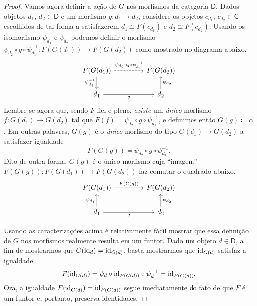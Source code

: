 \begin{proof}
  Vamos agora definir a ação de $G$ nos morfismos da categoria $\mathsf{D}$.
  Dados objetos $d_{1},\, d_{2} \in \mathsf{D}$ e um morfismo $g: d_{1} \to d_{2}$, considere os objetos $c_{d_{1}},\, c_{d_{2}} \in \mathsf{C}$ escolhidos de tal forma a satisfazerem $d_{1} \cong F(c_{d_{1}})$ e $d_{2} \cong F(c_{d_{2}})$.
  Usando os isomorfismo $\psi_{d_{1}}$ e $\psi_{d_{2}}$ podemos definir o morfismo $\psi_{d_{2}} \circ g \circ \psi_{d_{1}}^{-1}: F(G(d_{1})) \to F(G(d_{2}))$ como mostrado no diagrama abaixo.
  \begin{displaymath}
    \begin{tikzcd}[column sep=1.5cm]
      F(G(d_{1}))
      \arrow[r, dashed, "\psi_{d_{2}} \circ g \circ \psi_{d_{1}}^{-1}"]
      \arrow[d, "\psi_{d_{1}}^{-1}" swap]
      & F(G(d_{2}))
      \\ d_{1}
      \arrow[r, "g" swap]
      & d_{2}
      \arrow[u, "\psi_{d_{2}}" swap]
    \end{tikzcd}
  \end{displaymath}
  Lembre-se agora que, sendo $F$ fiel e pleno, \emph{existe} um \emph{único} morfismo $f: G(d_{1}) \to G(d_{2})$ tal que $F(f) = \psi_{d_{2}} \circ g \circ \psi_{d_{1}}^{-1}$, e definimos então $G(g) \coloneqq \alpha$.
  Em outras palavras, $G(g)$ é o \emph{único} morfismo do tipo $G(d_{1}) \to G(d_{2})$  a satisfazer igualdade
  \begin{displaymath}
    F(G(g)) = \psi_{d_{2}} \circ g \circ \psi_{d_{1}}^{-1}.
  \end{displaymath}
  Dito de outra forma, $G(g)$ é o único morfismo cuja ``imagem'' $F(G(g)): F(G(d_{1})) \to F(G(d_{2}))$ faz comutar o quadrado abaixo.
  \begin{equation}
    \label{eq:definicao_quase-inverso_morfismos}
    \begin{tikzcd}[column sep=1.5cm]
      F(G(d_{1}))
      \arrow[r, "F(G(g))"]
      & F(G(d_{2}))
      \\ d_{1}
      \arrow[u, "\psi_{d_{1}}"]
      \arrow[r, "g" swap]
      & d_{2}
      \arrow[u, "\psi_{d_{2}}" swap]
    \end{tikzcd}
  \end{equation}

  Usando as caracterizações acima é relativamente fácil mostrar que essa definição de $G$ nos morfismos realmente resulta em um funtor.
  Dado um objeto $d \in \mathsf{D}$, a fim de mostrarmos que $G(\mathrm{id}_{d}) = \mathrm{id}_{G(d)}$, basta mostrarmos que $\mathrm{id}_{G(d)}$ satisfaz a igualdade
  \begin{displaymath}
    F(\mathrm{id}_{G(d)}) = \psi_{d} \circ \mathrm{id}_{F(G(d))} \circ \psi_{d}^{-1} = \mathrm{id}_{F(G(d))}.
  \end{displaymath}
  Ora, a igualdade $F(\mathrm{id}_{G(d)}) = \mathrm{id}_{F(G(d))}$ segue imediatamente do fato de que $F$ é um funtor e, portanto, preserva identidades.


\end{proof}
